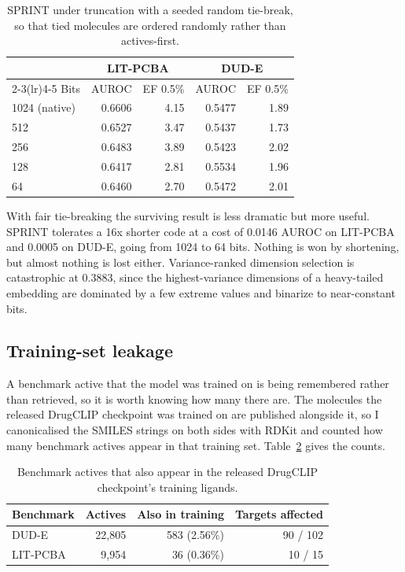 \documentclass[10pt,a4paper]{article}
\begin{document}
\begin{table}[h]
\centering
\small
\caption{\label{tab:truncation}SPRINT under truncation with a seeded random tie-break, so that tied molecules are
ordered randomly rather than actives-first.}
\begin{tabular}{lrrrr}
\toprule
 & \multicolumn{2}{c}{LIT-PCBA} & \multicolumn{2}{c}{DUD-E} \\
\cmidrule(lr){2-3}\cmidrule(lr){4-5}
Bits & AUROC & EF 0.5\% & AUROC & EF 0.5\% \\
\midrule
1024 (native) & 0.6606 & 4.15 & 0.5477 & 1.89 \\
512 & 0.6527 & 3.47 & 0.5437 & 1.73 \\
256 & 0.6483 & 3.89 & 0.5423 & 2.02 \\
128 & 0.6417 & 2.81 & 0.5534 & 1.96 \\
64 & 0.6460 & 2.70 & 0.5472 & 2.01 \\
\bottomrule
\end{tabular}
\end{table}

With fair tie-breaking the surviving result is less dramatic but more useful. SPRINT tolerates
a 16x shorter code at a cost of 0.0146 AUROC on LIT-PCBA and 0.0005 on DUD-E, going from 1024
to 64 bits. Nothing is won by shortening, but almost nothing is lost either. Variance-ranked
dimension selection is catastrophic at 0.3883, since the highest-variance dimensions of a
heavy-tailed embedding are dominated by a few extreme values and binarize to near-constant
bits.

\subsection{Training-set leakage}\label{sec:leakage}
A benchmark active that the model was trained on is being remembered rather than retrieved, so
it is worth knowing how many there are. The molecules the released DrugCLIP checkpoint was
trained on are published alongside it, so I canonicalised the SMILES strings on both sides with
RDKit \citep{bib:rdkit} and
counted how many benchmark actives appear in that training set. Table~\ref{tab:leakage} gives
the counts.

\begin{table}[h]
\centering
\small
\caption{\label{tab:leakage}Benchmark actives that also appear in the released DrugCLIP checkpoint's training
ligands.}
\begin{tabular}{lrrr}
\toprule
Benchmark & Actives & Also in training & Targets affected \\
\midrule
DUD-E & 22{,}805 & 583 (2.56\%) & 90 / 102 \\
LIT-PCBA & 9{,}954 & 36 (0.36\%) & 10 / 15 \\
\bottomrule
\end{tabular}
\end{table}
\end{document}
